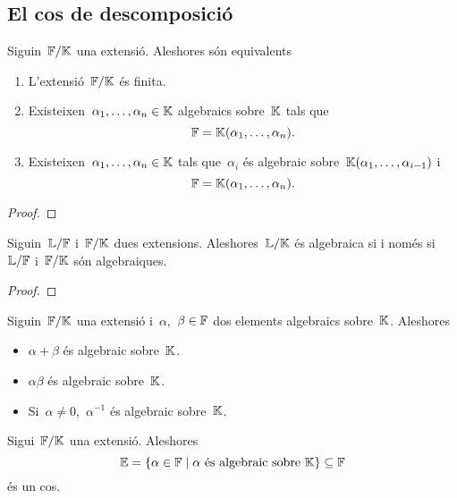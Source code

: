 \documentclass[../Apunts.tex]{subfiles}
\begin{document}
\subsection{El cos de descomposició}
	\begin{lemma}
		\label{lema:condicions equivalents a extensió finita}
		Siguin~\(\mathbb{F}/\mathbb{K}\) una extensió. Aleshores són equivalents
		\begin{enumerate}
		\item L'extensió~\(\mathbb{F}/\mathbb{K}\) és finita.
		\item Existeixen~\(\alpha_{1},\dots,\alpha_{n}\in\mathbb{K}\) algebraics sobre~\(\mathbb{K}\) tals que
		\[\mathbb{F}=\mathbb{K}(\alpha_{1},\dots,\alpha_{n}).\]
		\item Existeixen~\(\alpha_{1},\dots,\alpha_{n}\in\mathbb{K}\) tals que~\(\alpha_{i}\) és algebraic sobre~\(\mathbb{K}(\alpha_{1},\dots,\alpha_{i-1})\) i
		\[\mathbb{F}=\mathbb{K}(\alpha_{1},\dots,\alpha_{n}).\]
		\end{enumerate}
		\begin{proof}
		\end{proof}
	\end{lemma}
	\begin{theorem}
		\label{thm:teorema de les extensions algebraiques}
		Siguin~\(\mathbb{L}/\mathbb{F}\) i~\(\mathbb{F}/\mathbb{K}\) dues extensions. Aleshores~\(\mathbb{L}/\mathbb{K}\) és algebraica
		si i només si~\(\mathbb{L}/\mathbb{F}\) i~\(\mathbb{F}/\mathbb{K}\) són algebraiques.
		\begin{proof}
		\end{proof}
	\end{theorem}
	\begin{theorem}
		\label{thm:els nombres algebraics són un cos}
		Siguin~\(\mathbb{F}/\mathbb{K}\) una extensió i~\(\alpha\),~\(\beta\in\mathbb{F}\) dos elements algebraics sobre~\(\mathbb{K}\). Aleshores
		\begin{itemize}
		\item \(\alpha+\beta\) és algebraic sobre~\(\mathbb{K}\).
		\item \(\alpha\beta\) és algebraic sobre~\(\mathbb{K}\).
		\item Si~\(\alpha\neq0\),~\(\alpha^{-1}\) és algebraic sobre~\(\mathbb{K}\).
		\end{itemize}
	\end{theorem}
	\begin{corollary}
		\label{cor:els nombres algebraics són un cos}
		Sigui~\(\mathbb{F}/\mathbb{K}\) una extensió. Aleshores
		\[\mathbb{E}=\{\alpha\in\mathbb{F}\mid\alpha\text{ és algebraic sobre }\mathbb{K}\}\subseteq\mathbb{F}\]
		és un cos.
	\end{corollary}
\end{document}
